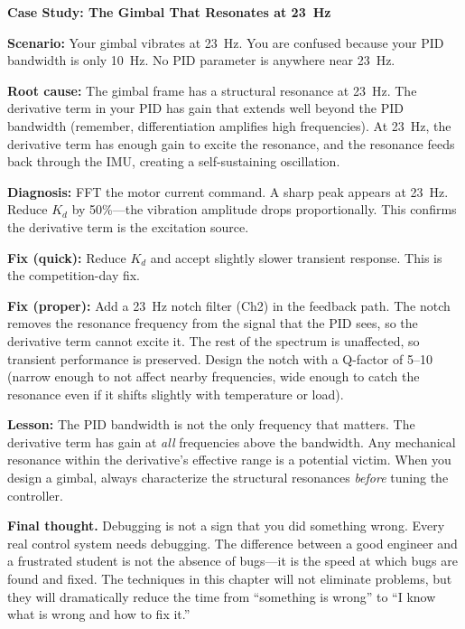 \begin{mdframed}[linewidth=1pt, innertopmargin=10pt, innerbottommargin=10pt]
\textbf{Case Study: The Gimbal That Resonates at 23~Hz}

\vspace{0.3em}
\textbf{Scenario:} Your gimbal vibrates at 23~Hz. You are confused because your PID bandwidth is only 10~Hz. No PID parameter is anywhere near 23~Hz.

\textbf{Root cause:} The gimbal frame has a structural resonance at 23~Hz. The derivative term in your PID has gain that extends well beyond the PID bandwidth (remember, differentiation amplifies high frequencies). At 23~Hz, the derivative term has enough gain to excite the resonance, and the resonance feeds back through the IMU, creating a self-sustaining oscillation.

\textbf{Diagnosis:} FFT the motor current command. A sharp peak appears at 23~Hz. Reduce $K_d$ by 50\%---the vibration amplitude drops proportionally. This confirms the derivative term is the excitation source.

\textbf{Fix (quick):} Reduce $K_d$ and accept slightly slower transient response. This is the competition-day fix.

\textbf{Fix (proper):} Add a 23~Hz notch filter (Ch2) in the feedback path. The notch removes the resonance frequency from the signal that the PID sees, so the derivative term cannot excite it. The rest of the spectrum is unaffected, so transient performance is preserved. Design the notch with a Q-factor of 5--10 (narrow enough to not affect nearby frequencies, wide enough to catch the resonance even if it shifts slightly with temperature or load).

\textbf{Lesson:} The PID bandwidth is not the only frequency that matters. The derivative term has gain at \textit{all} frequencies above the bandwidth. Any mechanical resonance within the derivative's effective range is a potential victim. When you design a gimbal, always characterize the structural resonances \textit{before} tuning the controller.
\end{mdframed}

\vspace{1em}

\vspace{0.5em}

\textbf{Final thought.} Debugging is not a sign that you did something wrong. Every real control system needs debugging. The difference between a good engineer and a frustrated student is not the absence of bugs---it is the speed at which bugs are found and fixed. The techniques in this chapter will not eliminate problems, but they will dramatically reduce the time from ``something is wrong'' to ``I know what is wrong and how to fix it.''
